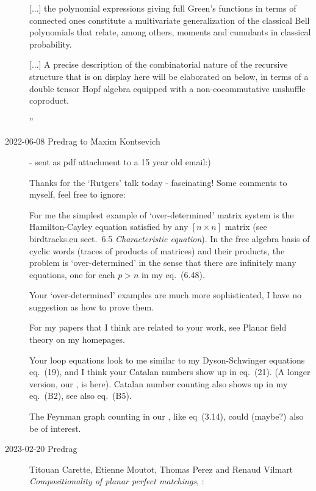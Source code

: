 \begin{description}
[...] the polynomial expressions giving full Green's functions in terms
of connected ones constitute a multivariate generalization of the
classical Bell polynomials that relate, among others, moments and
cumulants in classical probability.

[...]  A precise description of the combinatorial nature of the recursive
structure that is on display here will be elaborated on below, in terms
of a double tensor Hopf algebra equipped with a non-cocommutative
unshuffle coproduct.

''

\item[2022-06-08 Predrag to Maxim Kontsevich]
- sent as pdf attachment to a 15 year old email:)

Thanks for the `Rutgers' talk today - fascinating!
Some comments to myself, feel free to ignore:

For me the simplest example of `over-determined' matrix system is the
Hamilton-Cayley equation satisfied by any $[n\times{n}]$ matrix (see
birdtracks.eu
{sect.~6.5 {\em Characteristic equation}}). In the free algebra basis of
cyclic words (traces of products of matrices) and their products, the problem
is `over-determined' in the sense that there are infinitely many equations,
one for each $p>n$ in my eq.~(6.48).

Your `over-determined' examples are much more sophisticated, I have no
suggestion as how to prove them.

For my papers that I think are related to your work, see
{Planar field theory} on my homepages.

Your loop equations look to me similar to my 
Dyson-Schwinger equations
 {eq.~(19)},
and I think your Catalan numbers show up in eq.~(21).
(A longer version, our , is
 {here}).
Catalan number counting also shows up in my 
 {eq.~(B2)},
see also eq.~(B5).

The Feynman graph counting in our , like
 {eq~(3.14)},
could (maybe?) also be of interest.

   \item[2023-02-20 Predrag]
Titouan Carette, Etienne Moutot, Thomas Perez and Renaud Vilmart
{\em Compositionality of planar perfect matchings},
:


\end{description}
